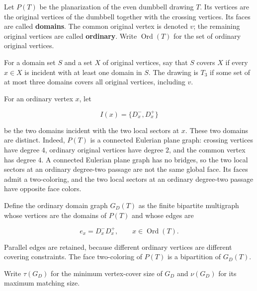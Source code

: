 \documentclass[11pt]{amsart}
\theoremstyle{definition}
\begin{document}
Let \(P(T)\) be the planarization of the even dumbbell drawing \(T\). Its vertices are the original vertices of the dumbbell together with the crossing vertices. Its faces are called \textbf{domains}. The common original vertex is denoted \(v\); the remaining original vertices are called \textbf{ordinary}. Write \(\operatorname{Ord}(T)\) for the set of ordinary original vertices.

For a domain set \(S\) and a set \(X\) of original vertices, say that \(S\) covers \(X\) if every \(x\in X\) is incident with at least one domain in \(S\). The drawing is \(T_3\) if some set of at most three domains covers all original vertices, including \(v\).

For an ordinary vertex \(x\), let

\[
I(x)=\{D_x^-,D_x^+\}
\]

be the two domains incident with the two local sectors at \(x\). These two domains
are distinct. Indeed, \(P(T)\) is a connected Eulerian plane graph: crossing
vertices have degree \(4\), ordinary original vertices have degree \(2\), and the
common vertex has degree \(4\). A connected Eulerian plane graph has no bridges,
so the two local sectors at an ordinary degree-two passage are not the same
global face. Its faces admit a two-coloring, and the two local sectors at an
ordinary degree-two passage have opposite face colors.

Define the ordinary domain graph \(G_D(T)\) as the finite bipartite multigraph whose vertices are the domains of \(P(T)\) and whose edges are

\[
e_x=D_x^-D_x^+,\qquad x\in\operatorname{Ord}(T).
\]

Parallel edges are retained, because different ordinary vertices are different covering constraints. The face two-coloring of \(P(T)\) is a bipartition of \(G_D(T)\).

Write \(\tau(G_D)\) for the minimum vertex-cover size of \(G_D\) and \(\nu(G_D)\) for
its maximum matching size.
\end{document}

